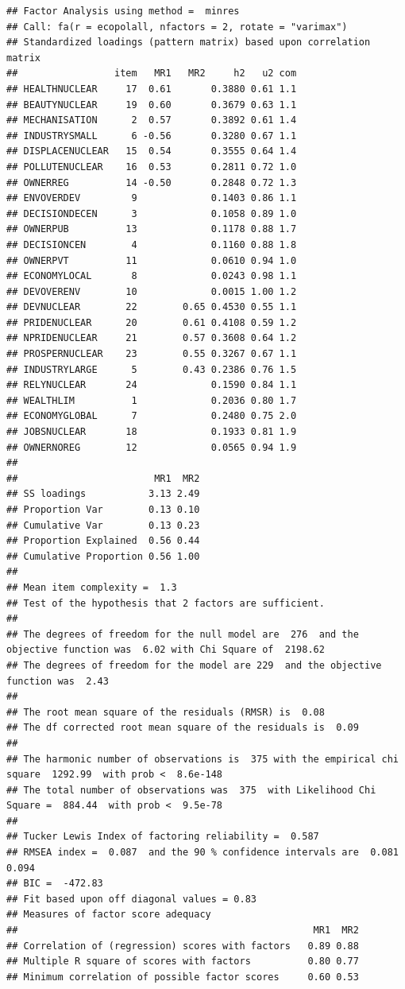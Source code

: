 \documentclass[
]{article}
\begin{document}
\begin{verbatim}
## Factor Analysis using method =  minres
## Call: fa(r = ecopolall, nfactors = 2, rotate = "varimax")
## Standardized loadings (pattern matrix) based upon correlation matrix
##                 item   MR1   MR2     h2   u2 com
## HEALTHNUCLEAR     17  0.61       0.3880 0.61 1.1
## BEAUTYNUCLEAR     19  0.60       0.3679 0.63 1.1
## MECHANISATION      2  0.57       0.3892 0.61 1.4
## INDUSTRYSMALL      6 -0.56       0.3280 0.67 1.1
## DISPLACENUCLEAR   15  0.54       0.3555 0.64 1.4
## POLLUTENUCLEAR    16  0.53       0.2811 0.72 1.0
## OWNERREG          14 -0.50       0.2848 0.72 1.3
## ENVOVERDEV         9             0.1403 0.86 1.1
## DECISIONDECEN      3             0.1058 0.89 1.0
## OWNERPUB          13             0.1178 0.88 1.7
## DECISIONCEN        4             0.1160 0.88 1.8
## OWNERPVT          11             0.0610 0.94 1.0
## ECONOMYLOCAL       8             0.0243 0.98 1.1
## DEVOVERENV        10             0.0015 1.00 1.2
## DEVNUCLEAR        22        0.65 0.4530 0.55 1.1
## PRIDENUCLEAR      20        0.61 0.4108 0.59 1.2
## NPRIDENUCLEAR     21        0.57 0.3608 0.64 1.2
## PROSPERNUCLEAR    23        0.55 0.3267 0.67 1.1
## INDUSTRYLARGE      5        0.43 0.2386 0.76 1.5
## RELYNUCLEAR       24             0.1590 0.84 1.1
## WEALTHLIM          1             0.2036 0.80 1.7
## ECONOMYGLOBAL      7             0.2480 0.75 2.0
## JOBSNUCLEAR       18             0.1933 0.81 1.9
## OWNERNOREG        12             0.0565 0.94 1.9
## 
##                        MR1  MR2
## SS loadings           3.13 2.49
## Proportion Var        0.13 0.10
## Cumulative Var        0.13 0.23
## Proportion Explained  0.56 0.44
## Cumulative Proportion 0.56 1.00
## 
## Mean item complexity =  1.3
## Test of the hypothesis that 2 factors are sufficient.
## 
## The degrees of freedom for the null model are  276  and the objective function was  6.02 with Chi Square of  2198.62
## The degrees of freedom for the model are 229  and the objective function was  2.43 
## 
## The root mean square of the residuals (RMSR) is  0.08 
## The df corrected root mean square of the residuals is  0.09 
## 
## The harmonic number of observations is  375 with the empirical chi square  1292.99  with prob <  8.6e-148 
## The total number of observations was  375  with Likelihood Chi Square =  884.44  with prob <  9.5e-78 
## 
## Tucker Lewis Index of factoring reliability =  0.587
## RMSEA index =  0.087  and the 90 % confidence intervals are  0.081 0.094
## BIC =  -472.83
## Fit based upon off diagonal values = 0.83
## Measures of factor score adequacy             
##                                                    MR1  MR2
## Correlation of (regression) scores with factors   0.89 0.88
## Multiple R square of scores with factors          0.80 0.77
## Minimum correlation of possible factor scores     0.60 0.53
\end{verbatim}
\end{document}
